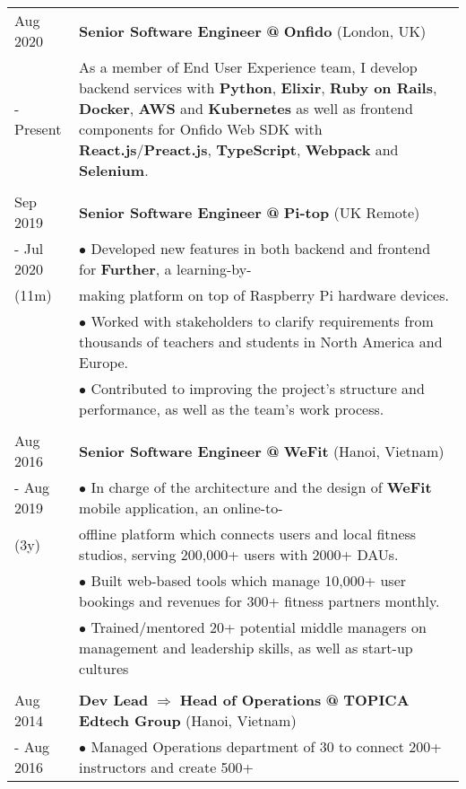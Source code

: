 \documentclass[12pt]{extarticle}
\makeatletter
\newcommand{\primary}[1]{\textcolor{primary}{\textbf{#1}}}
\newcommand{\secondary}[1]{\textcolor{secondary}{\textbf{#1}}}
\newcommand{\tertiary}[1]{\textcolor{tertiary}{#1}}
\newcommand{\tbullet}{\textcolor{tertiary}{\textbf{$\bullet$ }}}
\newcommand{\at}{\textcolor{tertiary}{\textbf{@ }}}
\newcommand{\then}{\textcolor{tertiary}{\textbf{$\Rightarrow$ }}}
\makeatother
\begin{document}
\begin{tabularx}{\textwidth}{@{} >{\raggedleft}p{2.25cm} | X @{}}
  Aug 2020 & \primary{Senior Software Engineer} \at \primary{Onfido} \tertiary{(London, UK)} \\
 - Present & As a member of End User Experience team, I develop backend services with \secondary{Python},
           \secondary{Elixir}, \secondary{Ruby on Rails}, \secondary{Docker}, \secondary{AWS} and \secondary{Kubernetes}
           as well as frontend components for Onfido Web SDK with \secondary{React.js}/\secondary{Preact.js}, \secondary{TypeScript},
           \secondary{Webpack} and \secondary{Selenium}. \\
  \\
  Sep 2019 & \primary{Senior Software Engineer} \at \primary{Pi-top} \tertiary{(UK Remote)} \\
- Jul 2020 & \tbullet Developed new features in both backend and frontend for \secondary{Further}, a learning-by- \\
     (11m) & making platform on top of Raspberry Pi hardware devices. \\
           & \tbullet Worked with stakeholders to clarify requirements from thousands of teachers and students in North America and Europe. \\
           & \tbullet Contributed to improving the project's structure and performance, as well as the team's work process. \\
  \\
  Aug 2016 & \primary{Senior Software Engineer} \at \primary{WeFit} \tertiary{(Hanoi, Vietnam)} \\
- Aug 2019 & \tbullet In charge of the architecture and the design of \secondary{WeFit} mobile application, an online-to- \\
      (3y) & offline platform which connects users and local fitness studios, serving 200,000+ users with 2000+ DAUs. \\
           & \tbullet Built web-based tools which manage 10,000+ user bookings and revenues for 300+ fitness partners monthly. \\
           & \tbullet Trained/mentored 20+ potential middle managers on management and leadership skills, as well as start-up cultures \\
  \\
  Aug 2014 & \primary{Dev Lead} \then \primary{Head of Operations} \at \primary{TOPICA Edtech Group} \tertiary{(Hanoi, Vietnam)} \\
- Aug 2016 & \tbullet Managed Operations department of 30 to connect 200+ instructors and create 500+ \\

\end{tabularx}
\end{document}
